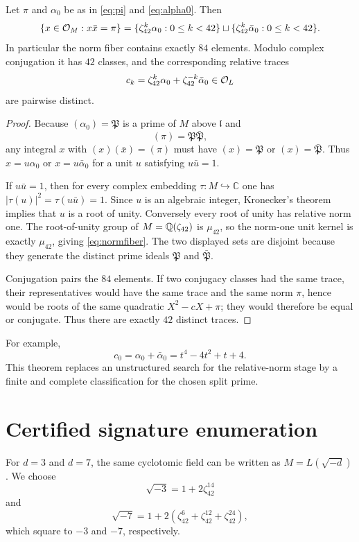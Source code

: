 \begin{theorem}\label{thm:42}
Let $\pi$ and $\alpha_0$ be as in \eqref{eq:pi} and \eqref{eq:alpha0}. Then
\begin{equation}\label{eq:normfiber}
 \{x\in\mathcal O_M:x\bar x=\pi\}
 =\{\zeta_{42}^k\alpha_0:0\le k<42\}
 \sqcup
 \{\zeta_{42}^k\bar\alpha_0:0\le k<42\}.
\end{equation}
In particular the norm fiber contains exactly $84$ elements. Modulo complex conjugation it has $42$ classes, and the corresponding relative traces
\[
 c_k=\zeta_{42}^k\alpha_0+\zeta_{42}^{-k}\bar\alpha_0\in\mathcal O_L
\]
are pairwise distinct.
\end{theorem}
\begin{proof}
Because $(\alpha_0)=\mathfrak P$ is a prime of $M$ above $\mathfrak l$ and
\[
 (\pi)=\mathfrak P\bar{\mathfrak P},
\]
any integral $x$ with $(x)(\bar x)=(\pi)$ must have $(x)=\mathfrak P$ or $(x)=\bar{\mathfrak P}$. Thus $x=u\alpha_0$ or $x=u\bar\alpha_0$ for a unit $u$ satisfying $u\bar u=1$.

If $u\bar u=1$, then for every complex embedding $\tau:M\hookrightarrow\mathbb C$ one has $|\tau(u)|^2=\tau(u\bar u)=1$.  Since $u$ is an algebraic integer, Kronecker's theorem implies that $u$ is a root of unity.  Conversely every root of unity has relative norm one.  The root-of-unity group of $M=\mathbb Q(\zeta_{42})$ is $\mu_{42}$, so the norm-one unit kernel is exactly $\mu_{42}$, giving \eqref{eq:normfiber}. The two displayed sets are disjoint because they generate the distinct prime ideals $\mathfrak P$ and $\bar{\mathfrak P}$.

Conjugation pairs the $84$ elements. If two conjugacy classes had the same trace, their representatives would have the same trace and the same norm $\pi$, hence would be roots of the same quadratic $X^2-cX+\pi$; they would therefore be equal or conjugate. Thus there are exactly $42$ distinct traces.
\end{proof}

For example,
\[
 c_0=\alpha_0+\bar\alpha_0=t^4-4t^2+t+4.
\]
This theorem replaces an unstructured search for the relative-norm stage by a finite and complete classification for the chosen split prime.


\section{Certified signature enumeration}
For $d=3$ and $d=7$, the same cyclotomic field can be written as $M=L(\sqrt{-d})$. We choose
\[
 \sqrt{-3}=1+2\zeta_{42}^{14}
\]
and
\[
 \sqrt{-7}=1+2(\zeta_{42}^{6}+\zeta_{42}^{12}+\zeta_{42}^{24}),
\]
which square to $-3$ and $-7$, respectively.

